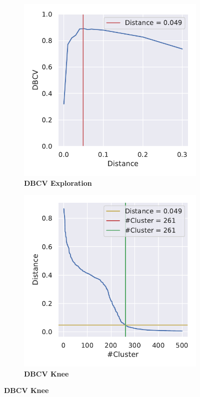 \begin{figure}[!hbt]
    \centering
    \begin{subfigure}[b]{0.475\textwidth}
        \caption[\Acrshort{DBCV} Exploration]{\textbf{\Acrshort{DBCV} Exploration}}
        \label{subfig:UMAP_Cluster_DBCV_Explo_4}            \includegraphics[width=\textwidth]{UMAP/Cluster_DBCV_Segment_4.pdf}
    \end{subfigure}
    \hfill
    \begin{subfigure}[b]{0.475\textwidth}
        \caption[\Acrshort{DBCV} Knee]{\textbf{\Acrshort{DBCV} Knee}}
        \label{subfig:UMAP_Cluster_DBCV_Elbow_4}            \includegraphics[width=\textwidth]{UMAP/Cluster_Elbow_DBCV_Segment_4.pdf}

\end{subfigure}
\end{figure}
